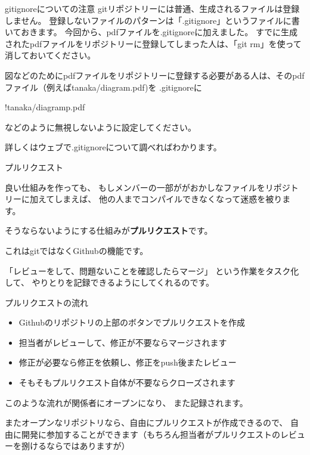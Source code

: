 \documentclass[12pt, unicode]{beamer}
\begin{document}
\begin{frame}{gitignoreについての注意}
gitリポジトリーには普通、生成されるファイルは登録しません。
登録しないファイルのパターンは「.gitignore」というファイルに書いておきます。
今回から、pdfファイルを.gitignoreに加えました。
すでに生成されたpdfファイルをリポジトリーに登録してしまった人は、「git rm」を使って消しておいてください。

図などのためにpdfファイルをリポジトリーに登録する必要がある人は、そのpdfファイル（例えばtanaka/diagram.pdf)を
.gitignoreに

!tanaka/diagramp.pdf

などのように無視しないように設定してください。

詳しくはウェブで.gitignoreについて調べればわかります。


\end{frame}

\begin{frame}{プルリクエスト}

良い仕組みを作っても、
もしメンバーの一部ががおかしなファイルをリポジトリーに加えてしまえば、
他の人までコンパイルできなくなって迷惑を被ります。

そうならないようにする仕組みが\textbf{プルリクエスト}です。

これはgitではなくGithubの機能です。

「レビューをして、問題ないことを確認したらマージ」
という作業をタスク化して、
やりとりを記録できるようにしてくれるのです。

\end{frame}
\begin{frame}{プルリクエストの流れ}

\begin{itemize}
\item Githubのリポジトリの上部のボタンでプルリクエストを作成
\item 担当者がレビューして、修正が不要ならマージされます
\item 修正が必要なら修正を依頼し、修正をpush後またレビュー
\item そもそもプルリクエスト自体が不要ならクローズされます
\end{itemize}

このような流れが関係者にオープンになり、
また記録されます。

またオープンなリポジトリなら、自由にプルリクエストが作成できるので、
自由に開発に参加することができます（もちろん担当者がプルリクエストのレビューを捌けるならではありますが）

\end{frame}
\end{document}
